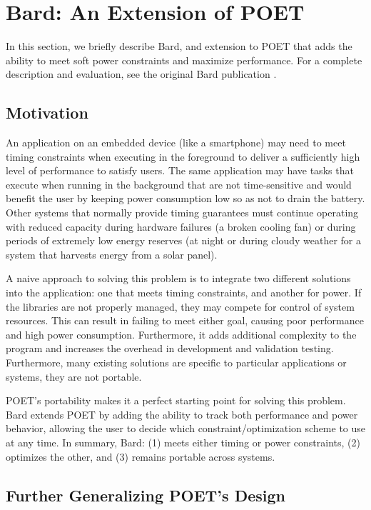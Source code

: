 \section{Bard: An Extension of POET}
\label{sec:poet-bard}

In this section, we briefly describe Bard, and extension to POET that adds the ability to meet soft power constraints and maximize performance.
For a complete description and evaluation, see the original Bard publication \cite{Bard}.


\subsection{Motivation}

An application on an embedded device (like a smartphone) may need to meet timing constraints when executing in the foreground to deliver a sufficiently high level of performance to satisfy users.
The same application may have tasks that execute when running in the background that are not time-sensitive and would benefit the user by keeping power consumption low so as not to drain the battery.
Other systems that normally provide timing guarantees must continue operating with reduced capacity during hardware failures (\eg a broken cooling fan) or during periods of extremely low energy reserves (\eg at night or during cloudy weather for a system that harvests energy from a solar panel).

A naive approach to solving this problem is to integrate two different solutions into the application: one that meets timing constraints, and another for power.
If the libraries are not properly managed, they may compete for control of system resources.
This can result in failing to meet either goal, causing poor performance and high power consumption.
Furthermore, it adds additional complexity to the program and increases the overhead in development and validation testing.
Furthermore, many existing solutions are specific to particular applications or systems, \ie they are not portable.

POET's portability makes it a perfect starting point for solving this problem.
Bard extends POET by adding the ability to track both performance and power behavior, allowing the user to decide which constraint/optimization scheme to use at any time.
In summary, Bard: (1) meets either timing or power constraints, (2) optimizes the other, and (3) remains portable across systems.


\subsection{Further Generalizing POET's Design}

